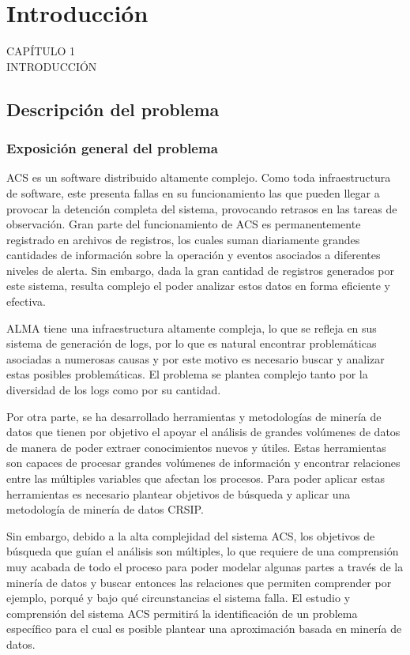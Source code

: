 
{
\Hide
\chapter{Introducción}
}

\begin{titular} 
	\uppercase{
	capítulo 1 \\
	introducción \\
	}
\end{titular}

\section{Descripción del problema}

\subsection{Exposición general del problema}
ACS es un software distribuido altamente complejo. Como toda infraestructura de software, este presenta fallas en su funcionamiento las que pueden llegar a provocar la detención completa del sistema, provocando retrasos en las tareas de observación.
Gran parte del funcionamiento de ACS es permanentemente registrado en archivos de registros, los cuales suman diariamente grandes cantidades de información sobre la operación y eventos asociados a diferentes niveles de alerta. Sin embargo, dada la gran cantidad de registros generados por este sistema, resulta complejo el poder analizar estos datos en forma eficiente y efectiva.
 
ALMA tiene una infraestructura altamente compleja, lo que se refleja en sus sistema de generación de logs, por lo que es natural encontrar problemáticas asociadas a numerosas causas y por este motivo es necesario buscar y analizar estas posibles problemáticas. El problema se plantea complejo tanto por la diversidad de los logs como por su cantidad.
 
Por otra parte, se ha desarrollado herramientas y metodologías de minería de datos que tienen por objetivo el apoyar el análisis de grandes volúmenes de datos de manera de poder extraer conocimientos nuevos y útiles. Estas herramientas son capaces de procesar grandes volúmenes de información y encontrar relaciones entre las múltiples variables que afectan los procesos. Para poder aplicar estas herramientas es necesario plantear objetivos de búsqueda y aplicar una metodología de minería de datos CRSIP.
 
Sin embargo, debido a la alta complejidad del sistema ACS, los objetivos de búsqueda que guían el análisis son múltiples, lo que requiere de una comprensión muy acabada de todo el proceso para poder modelar algunas partes a través de la minería de datos y buscar entonces las relaciones que permiten comprender por ejemplo, porqué y bajo qué circunstancias el sistema falla. El estudio y comprensión del sistema ACS permitirá la identificación de un problema específico para el cual es posible plantear una aproximación basada en minería de datos.

